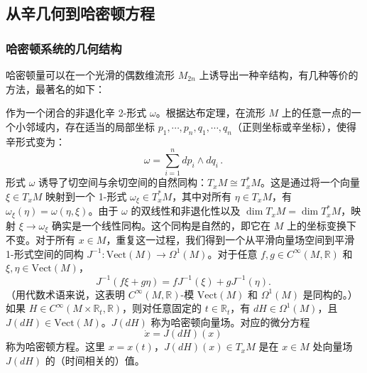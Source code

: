 \subsection{从辛几何到哈密顿方程}
\subsubsection{哈密顿系统的几何结构}
哈密顿量可以在一个光滑的偶数维流形 \( M_{2n} \) 上诱导出一种辛结构，有几种等价的方法，最著名的如下：

作为一个闭合的非退化辛 2-形式 \( \omega \)。根据达布定理，在流形 \( M \) 上的任意一点的一个小邻域内，存在适当的局部坐标 \( p_{1}, \cdots, p_{n}, q_{1}, \cdots, q_{n} \)（正则坐标或辛坐标），使得辛形式变为：
\[
\omega = \sum_{i=1}^{n} dp_{i} \wedge dq_{i} \,.~
\]
形式 \( \omega \) 诱导了切空间与余切空间的自然同构：\( T_x M \cong T_x^* M \)。这是通过将一个向量 \( \xi \in T_x M \) 映射到一个 1-形式 \( \omega_\xi \in T_x^* M \)，其中对所有 \( \eta \in T_x M \)，有 \( \omega_\xi(\eta) = \omega(\eta, \xi) \)。由于 \( \omega \) 的双线性和非退化性以及 \( \dim T_x M = \dim T_x^* M \)，映射 \( \xi \to \omega_\xi \) 确实是一个线性同构。这个同构是自然的，即它在 \( M \) 上的坐标变换下不变。对于所有 \( x \in M \)，重复这一过程，我们得到一个从平滑向量场空间到平滑 1-形式空间的同构 \( J^{-1}: \text{Vect}(M) \to \Omega^1(M) \)。对于任意 \( f, g \in C^{\infty}(M, \mathbb{R}) \) 和 \( \xi, \eta \in \text{Vect}(M) \)，
\[
J^{-1}(f \xi + g \eta) = f J^{-1}(\xi) + g J^{-1}(\eta).~
\]
（用代数术语来说，这表明 \( C^{\infty}(M, \mathbb{R}) \)-模 \( \text{Vect}(M) \) 和 \( \Omega^1(M) \) 是同构的。）如果 \( H \in C^{\infty}(M \times \mathbb{R}_t, \mathbb{R}) \)，则对任意固定的 \( t \in \mathbb{R}_t \)，有 \( dH \in \Omega^1(M) \)，且 \( J(dH) \in \text{Vect}(M) \)。\( J(dH) \) 称为哈密顿向量场。对应的微分方程
\[
\dot{x} = J(dH)(x)~
\]
称为哈密顿方程。这里 \( x = x(t) \)，\( J(dH)(x) \in T_x M \) 是在 \( x \in M \) 处向量场 \( J(dH) \) 的（时间相关的）值。